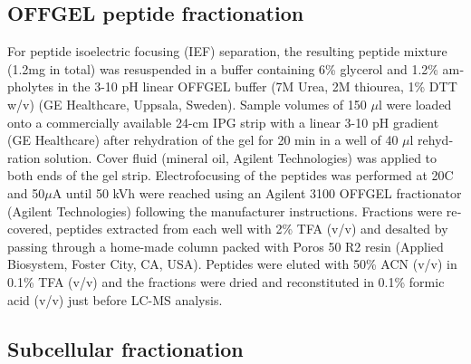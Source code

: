 \begin{otherlanguage}{british}
\subsection*{OFFGEL peptide fractionation}

For peptide isoelectric focusing (IEF) separation, the resulting peptide mixture (1.2mg in
total) was resuspended in a buffer containing 6\% glycerol and 1.2\% ampholytes in the 3-10
pH linear OFFGEL buffer (7M Urea, 2M thiourea, 1\% DTT w/v) (GE Healthcare, Uppsala,
Sweden). Sample volumes of 150  $\mu$l were loaded onto a commercially available 24-cm IPG
strip with a linear 3-10 pH gradient (GE Healthcare) after rehydration of the gel for 20 min in
a well of 40 $\mu$l rehydration solution. Cover fluid (mineral oil, Agilent Technologies) was applied
to both ends of the gel strip. Electrofocusing of the peptides was performed at 20C and 50$\mu$A 
until 50 kVh were reached using an Agilent 3100 OFFGEL fractionator (Agilent
Technologies) following the manufacturer instructions. Fractions were recovered, peptides
extracted from each well with 2\% TFA (v/v) and desalted by passing through a home-made
column packed with Poros 50 R2 resin (Applied Biosystem, Foster City, CA, USA). Peptides
were eluted with 50\% ACN (v/v) in 0.1\% TFA (v/v) and the fractions were dried and reconstituted in
0.1\% formic acid (v/v) just before LC-MS analysis.


\subsection*{Subcellular fractionation}


\end{otherlanguage}
